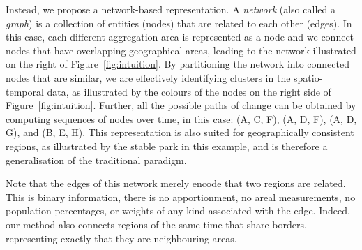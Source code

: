 Instead, we propose a network-based representation. A \emph{network} (also
called a \emph{graph}) is a collection of entities (nodes) that are related to
each other (edges). In this case, each different aggregation area is represented
as a node and we connect nodes that have overlapping geographical areas, leading to the network
illustrated on the right of Figure~\ref{fig:intuition}. By partitioning the
network into connected nodes that are similar, we are effectively identifying
clusters in the spatio-temporal data, as illustrated by the colours of the nodes
on the right side of Figure~\ref{fig:intuition}. Further, all the possible paths
of change can be obtained by computing sequences of nodes over time, in this
case: (A, C, F), (A, D, F), (A, D, G), and (B, E, H). This representation is
also suited for geographically consistent regions, as illustrated by the stable
park in this example, and is therefore a generalisation of the traditional
paradigm.

Note that the edges of this network merely encode that two regions are related.
This is binary information, there is no apportionment, no areal measurements, no
population percentages, or weights of any kind associated with the edge. Indeed,
our method also connects regions of the same time that share borders,
representing exactly that they are neighbouring areas.